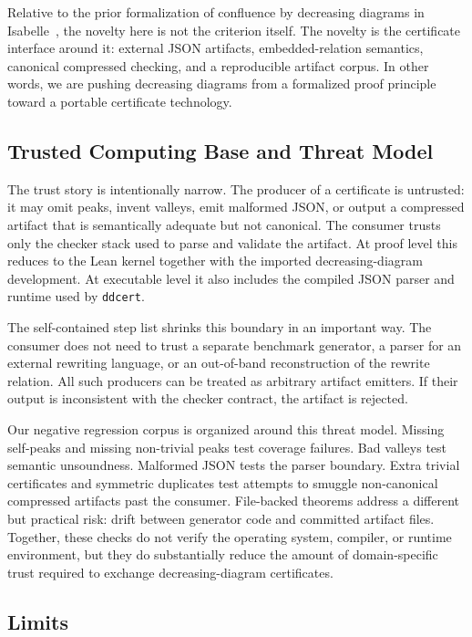 \documentclass[submission,copyright,creativecommons]{eptcs}
\newcommand{\lean}{Lean\xspace}
\newcommand{\ddcert}{\texttt{ddcert}\xspace}
\begin{document}
Relative to the prior formalization of confluence by decreasing diagrams in
Isabelle~\cite{zankl2013}, the novelty here is not the criterion itself. The
novelty is the certificate interface around it: external JSON artifacts,
embedded-relation semantics, canonical compressed checking, and a reproducible
artifact corpus. In other words, we are pushing decreasing diagrams from a
formalized proof principle toward a portable certificate technology.

\subsection{Trusted Computing Base and Threat Model}

The trust story is intentionally narrow. The producer of a certificate is
untrusted: it may omit peaks, invent valleys, emit malformed JSON, or output a
compressed artifact that is semantically adequate but not canonical. The
consumer trusts only the checker stack used to parse and validate the artifact.
At proof level this reduces to the \lean kernel together with the imported
decreasing-diagram development. At executable level it also includes the
compiled JSON parser and runtime used by \ddcert.

The self-contained step list shrinks this boundary in an important way. The
consumer does not need to trust a separate benchmark generator, a parser for an
external rewriting language, or an out-of-band reconstruction of the rewrite
relation. All such producers can be treated as arbitrary artifact emitters. If
their output is inconsistent with the checker contract, the artifact is
rejected.

Our negative regression corpus is organized around this threat model. Missing
self-peaks and missing non-trivial peaks test coverage failures. Bad valleys
test semantic unsoundness. Malformed JSON tests the parser boundary. Extra
trivial certificates and symmetric duplicates test attempts to smuggle
non-canonical compressed artifacts past the consumer. File-backed theorems
address a different but practical risk: drift between generator code and
committed artifact files. Together, these checks do not verify the operating
system, compiler, or runtime environment, but they do substantially reduce the
amount of domain-specific trust required to exchange decreasing-diagram
certificates.

\subsection{Limits}
\end{document}

